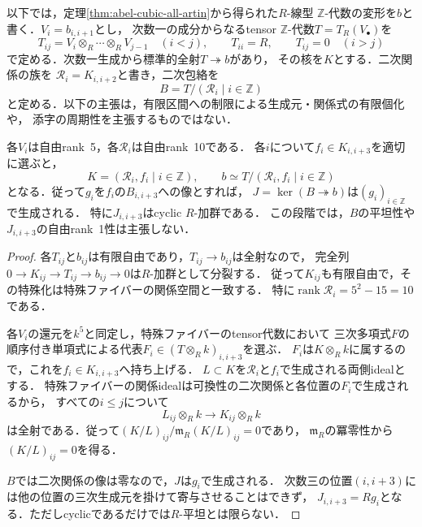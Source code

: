 以下では，定理\ref{thm:abel-cubic-all-artin}から得られた$R$-線型
$\mathbb Z$-代数の変形を$b$と書く．$V_i=b_{i,i+1}$とし，
次数一の成分からなるtensor $\mathbb Z$-代数$T=T_R(V_\bullet)$を
\[
 T_{ij}=V_i\otimes_R\cdots\otimes_R V_{j-1}\quad(i<j),
 \qquad T_{ii}=R,\qquad T_{ij}=0\quad(i>j)
\]
で定める．次数一生成から標準的全射$T\twoheadrightarrow b$があり，
その核を$K$とする．二次関係の族を
$\mathcal R_i=K_{i,i+2}$と書き，二次包絡を
\[
 B=T/(\mathcal R_i\mid i\in\mathbb Z)
\]
と定める．以下の主張は，有限区間への制限による生成元・関係式の有限個化や，
添字の周期性を主張するものではない．

\begin{proposition}[二次関係と一つの三次関係による提示]
\label{prop:abel-quadratic-cubic-presentation}
各$V_i$は自由rank~5，各$\mathcal R_i$は自由rank~10である．
各$i$について$f_i\in K_{i,i+3}$を適切に選ぶと，
\[
 K=(\mathcal R_i,f_i\mid i\in\mathbb Z),
 \qquad b\simeq T/(\mathcal R_i,f_i\mid i\in\mathbb Z)
\]
となる．従って$g_i$を$f_i$の$B_{i,i+3}$への像とすれば，
$J=\ker(B\twoheadrightarrow b)$は$(g_i)_{i\in\mathbb Z}$で生成される．
特に$J_{i,i+3}$はcyclic $R$-加群である．
この段階では，$B$の平坦性や$J_{i,i+3}$の自由rank~1性は主張しない．
\end{proposition}
\begin{proof}
各$T_{ij}$と$b_{ij}$は有限自由であり，$T_{ij}\to b_{ij}$は全射なので，
完全列$0\to K_{ij}\to T_{ij}\to b_{ij}\to0$は$R$-加群として分裂する．
従って$K_{ij}$も有限自由で，その特殊化は特殊ファイバーの関係空間と一致する．
特に$\operatorname{rank}\mathcal R_i=5^2-15=10$である．

各$V_i$の還元を$k^5$と同定し，特殊ファイバーのtensor代数において
三次多項式$F$の順序付き単項式による代表$F_i\in(T\otimes_Rk)_{i,i+3}$を選ぶ．
$F_i$は$K\otimes_Rk$に属するので，これを$f_i\in K_{i,i+3}$へ持ち上げる．
$L\subset K$を$\mathcal R_i$と$f_i$で生成される両側idealとする．
特殊ファイバーの関係idealは可換性の二次関係と各位置の$F_i$で生成されるから，
すべての$i\leq j$について
\[
 L_{ij}\otimes_R k\longrightarrow K_{ij}\otimes_R k
\]
は全射である．従って$(K/L)_{ij}/\mathfrak m_R(K/L)_{ij}=0$であり，
$\mathfrak m_R$の冪零性から$(K/L)_{ij}=0$を得る．

$B$では二次関係の像は零なので，$J$は$g_i$で生成される．
次数三の位置$(i,i+3)$には他の位置の三次生成元を掛けて寄与させることはできず，
$J_{i,i+3}=Rg_i$となる．ただしcyclicであるだけでは$R$-平坦とは限らない．
\end{proof}

